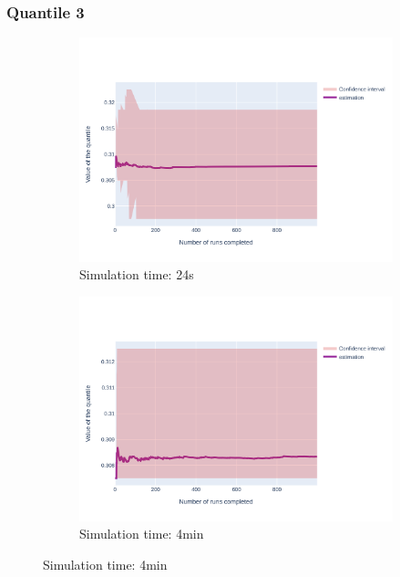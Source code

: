 \documentclass{article}
\begin{document}
\subsubsection{Quantile 3}
\begin{figure}[H]
    \centering
    \begin{subfigure}{.495\textwidth}
        \centering
        \includegraphics[width=\textwidth]{../fig/quantile3/CC1: CAM2 --> ECU2_24s.png}
        \caption{Simulation time: 24s}
        \vspace{.5cm}
    \end{subfigure}
    \begin{subfigure}{.495\textwidth}
        \centering
        \includegraphics[width=\textwidth]{../fig/quantile3/CC1: CAM2 --> ECU2_4mn.png}
        \caption{Simulation time: 4min}

\end{subfigure}
\end{figure}
\end{document}
